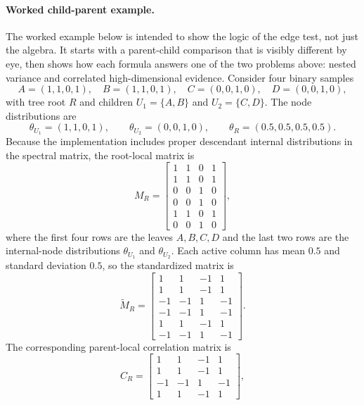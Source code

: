 \paragraph{Worked child-parent example.}
The worked example below is intended to show the logic of the edge test, not
just the algebra. It starts with a parent-child comparison that is visibly
different by eye, then shows how each formula answers one of the two problems
above: nested variance and correlated high-dimensional evidence. Consider four
binary samples
\begin{equation}
A=(1,1,0,1),\quad
B=(1,1,0,1),\quad
C=(0,0,1,0),\quad
D=(0,0,1,0),
\end{equation}
with tree root $R$ and children $U_1=\{A,B\}$ and $U_2=\{C,D\}$. The node
distributions are
\begin{equation}
\theta_{U_1}=(1,1,0,1),\qquad
\theta_{U_2}=(0,0,1,0),\qquad
\theta_R=(0.5,0.5,0.5,0.5).
\end{equation}
Because the implementation includes proper descendant internal distributions in
the spectral matrix, the root-local matrix is
\begin{equation}
M_R =
\begin{bmatrix}
1&1&0&1\\
1&1&0&1\\
0&0&1&0\\
0&0&1&0\\
1&1&0&1\\
0&0&1&0
\end{bmatrix},
\end{equation}
where the first four rows are the leaves $A,B,C,D$ and the last two rows are
the internal-node distributions $\theta_{U_1}$ and $\theta_{U_2}$. Each active
column has mean $0.5$ and standard deviation $0.5$, so the standardized matrix
is
\begin{equation}
\widetilde{M}_R =
\begin{bmatrix}
1&1&-1&1\\
1&1&-1&1\\
-1&-1&1&-1\\
-1&-1&1&-1\\
1&1&-1&1\\
-1&-1&1&-1
\end{bmatrix}.
\end{equation}
The corresponding parent-local correlation matrix is
\begin{equation}
C_R =
\begin{bmatrix}
1&1&-1&1\\
1&1&-1&1\\
-1&-1&1&-1\\
1&1&-1&1
\end{bmatrix},
\end{equation}
